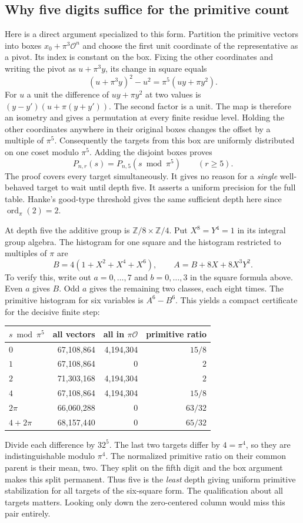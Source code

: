 \documentclass[12pt,letterpaper]{article}
\begin{document}
\subsection{Why five digits suffice for the primitive count}
Here is a direct argument specialized to this form. Partition the primitive vectors into boxes $x_0+\pi^3\mathcal O^n$ and choose the first unit coordinate of the representative as a pivot. Its index is constant on the box. Fixing the other coordinates and writing the pivot as $u+\pi^3 y$, its change in square equals
\[
 (u+\pi^3y)^2-u^2=\pi^5(uy+\pi y^2).
\]
For $u$ a unit the difference of $uy+\pi y^2$ at two values is $(y-y')(u+\pi(y+y'))$. The second factor is a unit. The map is therefore an isometry and gives a permutation at every finite residue level. Holding the other coordinates anywhere in their original boxes changes the offset by a multiple of $\pi^5$. Consequently the targets from this box are uniformly distributed on one coset modulo $\pi^5$. Adding the disjoint boxes proves
\[
       P_{n,r}(s)=P_{n,5}(s\bmod\pi^5)\qquad(r\ge5).
\]
The proof covers every target simultaneously. It gives no reason for a \emph{single} well-behaved target to wait until depth five. It asserts a uniform precision for the full table. Hanke's good-type threshold gives the same sufficient depth here since $\operatorname{ord}_{\pi}(2)=2$.

At depth five the additive group is $\mathbb Z/8\times\mathbb Z/4$. Put $X^8=Y^4=1$ in its integral group algebra. The histogram for one square and the histogram restricted to multiples of $\pi$ are
\[
 B=4(1+X^2+X^4+X^6),\qquad A=B+8X+8X^3Y^2.
\]
To verify this, write out $a=0,\ldots,7$ and $b=0,\ldots,3$ in the square formula above. Even $a$ gives $B$. Odd $a$ gives the remaining two classes, each eight times. The primitive histogram for six variables is $A^6-B^6$. This yields a compact certificate for the decisive finite step:
\begin{center}\small
\begin{tabular}{lrrr}\toprule
$s\bmod\pi^5$ & all vectors & all in $\pi\mathcal O$ & primitive ratio\\\midrule
$0$ & 67,108,864 & 4,194,304 & $15/8$\\
$1$ & 67,108,864 & 0 & $2$\\
$2$ & 71,303,168 & 4,194,304 & $2$\\
$4$ & 67,108,864 & 4,194,304 & $15/8$\\
$2\pi$ & 66,060,288 & 0 & $63/32$\\
$4+2\pi$ & 68,157,440 & 0 & $65/32$\\\bottomrule
\end{tabular}
\end{center}
Divide each difference by $32^5$. The last two targets differ by $4=\pi^4$, so they are indistinguishable modulo $\pi^4$. The normalized primitive ratio on their common parent is their mean, two. They split on the fifth digit and the box argument makes this split permanent. Thus five is the \emph{least} depth giving uniform primitive stabilization for all targets of the six-square form. The qualification about all targets matters. Looking only down the zero-centered column would miss this pair entirely.
\end{document}
